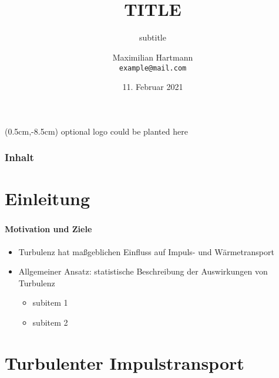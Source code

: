 \documentclass[10pt,xcolor=dvipsnames]{beamer}
\title[Thesis]{\vspace{2cm} \\ TITLE}
\subtitle{subtitle}
\author[M. Hartmann]{Maximilian Hartmann \\ %
	\texttt{\scriptsize example@mail.com}}
\institute[Group A]{institution}
\date[Februar 2021]{11. Februar 2021}
\begin{document}
\begin{frame}
\titlepage
\begin{textblock*}{2cm}(0.5cm,-8.5cm)
	optional logo could be planted here
\end{textblock*}
\end{frame}

\begin{frame}
\frametitle{Inhalt}
\tableofcontents
\end{frame}

\section{Einleitung}
\begin{frame}
    \frametitle{\secname}
\framesubtitle{Motivation und Ziele}
    \begin{itemize}
        \item Turbulenz hat maßgeblichen Einfluss auf Impuls- und Wärmetransport 
            \pause
        \item Allgemeiner Ansatz: statistische Beschreibung der Auswirkungen von Turbulenz \\
            \begin{itemize}
                \item subitem 1
                \item subitem 2
                    \pause
            \end{itemize}
    \end{itemize}
\end{frame}
\section{Turbulenter Impulstransport}
\end{document}
